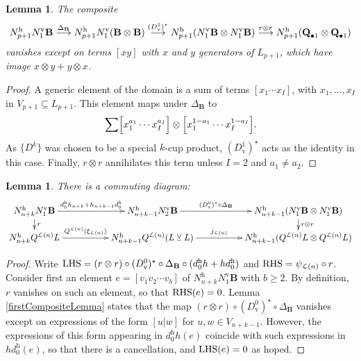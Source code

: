 \documentclass[11pt]{amsart} \renewcommand{\baselinestretch}{1.4}
\theoremstyle{plain}
\newtheorem{lem}[thm]{Lemma}
\theoremstyle{definition}
\renewcommand{\to}{\longrightarrow}
\newcommand{\calL}{\mathcal{L}}
\newcommand{\DeltatubfD}{\Delta_{\mathrm{\textbf{B}}}}
\newcommand{\uver}{^\mathrm{v}}
\newcommand{\uhor}{^\mathrm{h}}
\newcommand{\dver}{_\mathrm{v}}
\newcommand{\smashcoprod}{\veebar}%
\begin{document}
\begin{appendices}
\begin{lem}
The composite
\[N\uhor_{p+1} N\uver_1\textup{\textbf{B}}\overset{\DeltatubfD}{\to} N\uhor_{p+1}N\uver_1(\textup{\textbf{B}}\otimes\textup{\textbf{B}}) \overset{(D\dver^1)^\star}{\to} N\uhor_{p+1}(N\uver_1\textup{\textbf{B}}\otimes N\uver_1\textup{\textbf{B}})\overset{r\otimes r}{\to}N\uhor_{p+1}(\textup{\textbf{Q}}_{\bullet 1}\otimes \textup{\textbf{Q}}_{\bullet 1})\]
vanishes except on terms $[xy]$ with $x$ and $y$ generators of $ L_{p+1}$, which have image $x\otimes y+y\otimes x$.
\end{lem}
\begin{proof}
A generic element of the domain is a sum of terms $[x_1\cdots x_I]$, with $x_1,\ldots,x_I$ in $V_{p+1}\subseteq L_{p+1}$. This element maps under $\DeltatubfD$ to
\[\sum
\Bigl[x_1^{a_1}\cdots x_I^{a_I}\Bigr]\otimes
\Bigl[x_1^{1-a_1}\cdots x_I^{1-a_I}\Bigr].\]
As $\{D^k\}$ was chosen to be a special $k$-cup product, $(D\dver^1)^\star$ acts as the identity in this case.
Finally, $r\otimes r$ annihilates this term unless $I=2$ and $a_1\neq a_2$.
\end{proof}
\begin{lem}
\label{commuting rectangle lemma for lie operations}
There is a commuting diagram:
\[\xymatrix@R=4mm@C=18mm{
N\uhor_{n+k}N\uver_1\textup{\textbf{B}} \ar[r]^-{d\uhor_0h_{n+k}+h_{n+k-1}d\uhor_0}
\ar[d]^-{r}&%
N\uhor_{n+k-1}N\uver_2\textup{\textbf{B}} \ar[r]^-{(D\dver^0)^\star\circ\DeltatubfD}&%
N\uhor_{n+k-1}(N\uver_1\textup{\textbf{B}}\otimes N\uver_1\textup{\textbf{B}})\ar[d]^-{r\otimes r}
\\%
N\uhor_{n+k}Q^{\calL(n)} L  \ar[r]^-{Q^{\calL(n)}(\xi_{\calL(n)})}&%
N\uhor_{n+k-1}Q^{\calL(n)}( L\smashcoprod  L) \ar[r]^-{j_{\calL(n)}}&%
N\uhor_{n+k-1}(Q^{\calL(n)} L \otimes Q^{\calL(n)} L )
}\]
\end{lem}
\begin{proof}
Write
$\textup{LHS}=(r\otimes r)\circ (D\dver^0)^\star\circ\DeltatubfD\circ(d\uhor_0h+hd\uhor_0)$ and $\textup{RHS}= \psi_{\calL(n)}\circ r$.
Consider first an element $e=[v_1v_2\cdots v_b]$ of $N\uhor_{n+k}N\uver_1\textbf{B}$ with $b\geq2$. By definition, $r$ vanishes on such an element, so that $\textup{RHS}(e)=0$. Lemma \ref{firstCompositeLemma} states that the map $(r\otimes r)\circ (D\dver^0)^\star\circ\DeltatubfD$ vanishes except on expressions of the form $[u|w]$ for $u,w\in V_{n+k-1}$. However, the expressions of this form appearing in $d\uhor_0h(e)$ coincide with such expressions in $hd\uhor_0(e)$, so that there is a cancellation, and $\textup{LHS}(e)=0$ as hoped. 


\end{proof}
\end{appendices}
\end{document}
